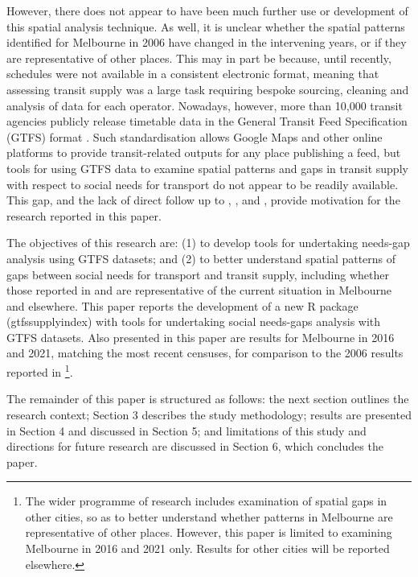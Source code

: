 \documentclass[preprint, 3p,
authoryear]{elsarticle} %
\begin{document}
However, there does not appear to have been much further use or
development of this spatial analysis technique. As well, it is unclear
whether the spatial patterns identified for Melbourne in 2006 have
changed in the intervening years, or if they are representative of other
places. This may in part be because, until recently, schedules were not
available in a consistent electronic format, meaning that assessing
transit supply was a large task requiring bespoke sourcing, cleaning and
analysis of data for each operator. Nowadays, however, more than 10,000
transit agencies publicly release timetable data in the General Transit
Feed Specification (GTFS) format \citep{GTFS}. Such standardisation
allows Google Maps and other online platforms to provide transit-related
outputs for any place publishing a feed, but tools for using GTFS data
to examine spatial patterns and gaps in transit supply with respect to
social needs for transport do not appear to be readily available. This
gap, and the lack of direct follow up to \citet{Currie2003Hobart},
\citet{Currie2004Gap}, \citet{Currie2007Identifying} and
\citet{currie2010identifying}, provide motivation for the research
reported in this paper.

The objectives of this research are: (1) to develop tools for
undertaking needs-gap analysis using GTFS datasets; and (2) to better
understand spatial patterns of gaps between social needs for transport
and transit supply, including whether those reported in
\citet{Currie2007Identifying} and \citet{currie2010identifying} are
representative of the current situation in Melbourne and elsewhere. This
paper reports the development of a new R package (gtfssupplyindex) with
tools for undertaking social needs-gaps analysis with GTFS datasets.
Also presented in this paper are results for Melbourne in 2016 and 2021,
matching the most recent censuses, for comparison to the 2006 results
reported in \citet{currie2010identifying}\footnote{The wider programme
  of research includes examination of spatial gaps in other cities, so
  as to better understand whether patterns in Melbourne are
  representative of other places. However, this paper is limited to
  examining Melbourne in 2016 and 2021 only. Results for other cities
  will be reported elsewhere.}.

The remainder of this paper is structured as follows: the next section
outlines the research context; Section 3 describes the study
methodology; results are presented in Section 4 and discussed in Section
5; and limitations of this study and directions for future research are
discussed in Section 6, which concludes the paper.
\end{document}
